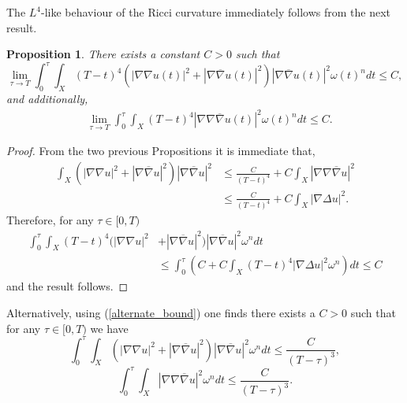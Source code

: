 \documentclass[12pt]{article}
\newtheorem{proposition}[theorem]{Proposition}
\numberwithin{equation}{section}
\newcommand{\oo}[1]{\overline{#1}}
\begin{document}
\noindent The $L^4$-like behaviour of the Ricci curvature immediately follows from the next result.

\begin{proposition}
There exists a constant $C > 0$ such that
\begin{equation}\label{mixed_hessian_bound}
    \lim_{\tau \to T} \int_{0}^{\tau} \int_X (T-t)^4(|\nabla \nabla u(t)|^2 + |\nabla \oo{\nabla} u(t)|^2)|\nabla \oo{\nabla} u(t)|^2 \omega(t)^n dt \leq C,
\end{equation}
and additionally,
\begin{align*}
    &\lim_{\tau \to T} \int_0^\tau \int_X (T-t)^4 |\nabla \nabla \oo{\nabla} u(t)|^2 \omega(t)^n dt \leq C.
\end{align*}
\end{proposition}

\begin{proof} From the two previous Propositions it is immediate that,
\begin{align}
    \int_X (|\nabla \nabla u|^2 + |\nabla \oo{\nabla} u|^2)|\nabla \oo{\nabla} u|^2 &\leq \frac{C}{(T-t)^4} + C \int_X |\nabla \nabla \oo{\nabla} u|^2 \nonumber\\
    &\leq \frac{C}{(T-t)^4} +C\int_X |\nabla \Delta u|^2 \label{intermediate_L4_estimate}.
\end{align}
Therefore, for any $\tau \in [0,T)$
\begin{align*}
    \int_{0}^\tau \int_X (T-t)^4(|\nabla \nabla u|^2 &+ |\nabla \oo{\nabla} u|^2)|\nabla \oo{\nabla} u|^2 \omega^n dt\\
    &\leq \int_0^\tau \left(C + C\int_X (T-t)^4 |\nabla \Delta u|^2 \omega^n \right) dt \leq C
\end{align*}
and the result follows.

\end{proof}

\noindent Alternatively, using (\ref{alternate_bound}) one finds there exists a $C>0$ such that for any $\tau \in [0,T)$ we have
\begin{equation}\label{alternate_hessian_bound}
    \int_0^{\tau} \int_X (|\nabla \nabla u|^2 + |\nabla \oo{\nabla} u|^2)|\nabla \oo{\nabla} u|^2 \omega^n dt \leq \frac{C}{(T-\tau)^3},
\end{equation}
\begin{equation*}
    \int_0^{\tau} \int_X |\nabla \nabla \oo{\nabla} u|^2 \omega^n dt \leq \frac{C}{(T-\tau)^3}.
\end{equation*}
\end{document}
